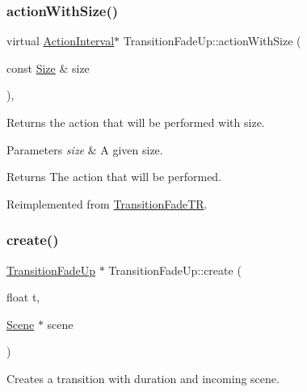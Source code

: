\subsubsection{\texorpdfstring{action\+With\+Size()}{actionWithSize()}\hspace{0.1cm}{\footnotesize\ttfamily [2/2]}}
{\footnotesize\ttfamily virtual \hyperlink{classActionInterval}{Action\+Interval}$\ast$ Transition\+Fade\+Up\+::action\+With\+Size (\begin{DoxyParamCaption}\item[{const \hyperlink{classSize}{Size} \&}]{size }\end{DoxyParamCaption})\hspace{0.3cm}{\ttfamily [override]}, {\ttfamily [virtual]}}

Returns the action that will be performed with size.


\begin{DoxyParams}{Parameters}
{\em size} & A given size. \\
\hline
\end{DoxyParams}
\begin{DoxyReturn}{Returns}
The action that will be performed. 
\end{DoxyReturn}


Reimplemented from \hyperlink{classTransitionFadeTR_a371a39553335050a845c6743d20aac00}{Transition\+Fade\+TR}.

\mbox{\label{classTransitionFadeUp_a63880a7f57ba3e8a88e9d0f4c1fae429}} 
\subsubsection{\texorpdfstring{create()}{create()}\hspace{0.1cm}{\footnotesize\ttfamily [1/2]}}
{\footnotesize\ttfamily \hyperlink{classTransitionFadeUp}{Transition\+Fade\+Up} $\ast$ Transition\+Fade\+Up\+::create (\begin{DoxyParamCaption}\item[{float}]{t,  }\item[{\hyperlink{classScene}{Scene} $\ast$}]{scene }\end{DoxyParamCaption})\hspace{0.3cm}{\ttfamily [static]}}

Creates a transition with duration and incoming scene.


